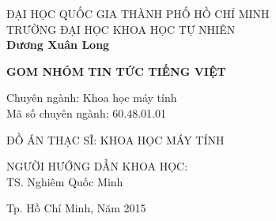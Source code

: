 \begin{titlepage}

\begin{center}
ĐẠI HỌC QUỐC GIA THÀNH PHỐ HỒ CHÍ MINH\\
TRƯỜNG ĐẠI HỌC KHOA HỌC TỰ NHIÊN\\[2cm]

{ \LARGE \bfseries Dương Xuân Long\\[1cm] } 

{ \huge \bfseries GOM NHÓM TIN TỨC TIẾNG VIỆT\\[2cm] } 


\begin{flushleft} \large
Chuyên ngành: Khoa học máy tính\\
Mã số chuyên ngành: 60.48.01.01\\[2cm]
\end{flushleft}

\large ĐỒ ÁN THẠC SĨ: KHOA HỌC MÁY TÍNH\\[2cm]


\begin{flushright} \large
NGƯỜI HƯỚNG DẪN KHOA HỌC:\\
TS. Nghiêm Quốc Minh
\end{flushright}


\vfill
Tp. Hồ Chí Minh, Năm 2015

\end{center}

\end{titlepage}